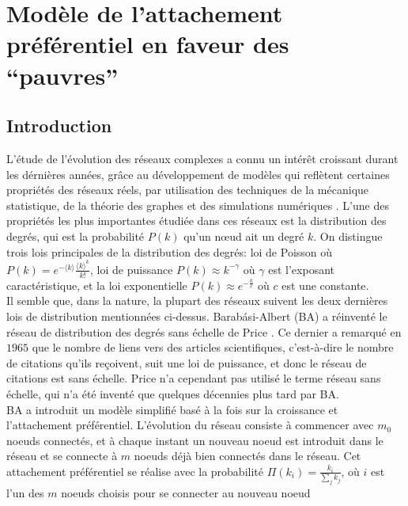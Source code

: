 
\newcommand{\kms}{\textless k_s(t) \textgreater}
\newcommand{\kmss}{\textless k_s^2(t) \textgreater}
\chapter{Modèle de l'attachement préférentiel en faveur des ``pauvres''}
\begin{minipage}{\textwidth}
	\linespread{1.2}
	\minitoc
\end{minipage}

\section{Introduction}
L'étude de l'évolution des réseaux complexes a connu un intérêt croissant durant les dérnières années, grâce au 
développement de modèles qui reflètent certaines propriétés des réseaux réels, par utilisation des techniques
de la  mécanique statistique, de la théorie des graphes et des simulations numériques 
\cite{BA1999,AB2002,Dorogovtsev-Mendes2002,Newman2003}. L'une des propriétés les plus importantes
étudiée dans ces réseaux est la distribution des degrés, qui est la probabilité $P(k)$ qu'un nœud ait un degré $k$.
On  distingue trois lois principales de la distribution des degrés: loi de Poisson où 
$P(k)=e^{-\langle k\rangle}\frac{\langle k\rangle^k}{k!}$, loi de puissance $P(k)\approx k^{-\gamma}$
où $\gamma$ est l'exposant caractéristique, et la loi exponentielle $P(k)\approx e^{-\frac{k}{c}}$ où
$c$ est une constante.\\
Il semble que, dans la nature, la plupart des réseaux suivent les deux dernières lois de distribution 
mentionnées ci-dessus. Barab\'{a}si-Albert (BA) a réinventé le réseau de distribution des degrés 
sans échelle de Price \cite{Price}. Ce dernier a  remarqué en $1965$ que le nombre de liens vers des articles 
scientifiques, c'est-à-dire le nombre de citations  qu'ils reçoivent, suit une loi de puissance, et donc le 
réseau de citations est sans échelle. Price n'a cependant pas utilisé le terme réseau sans échelle, qui n'a été 
inventé que quelques décennies plus tard par BA.\\
BA a introduit un modèle simplifié basé à la fois sur la croissance et 
l'attachement préférentiel. L'évolution du réseau consiste à commencer avec $m_0$ noeuds connectés, et à
chaque instant un nouveau noeud est introduit dans le réseau et se connecte à $m$ noeuds déjà bien connectés
dans le réseau. Cet attachement préférentiel se réalise avec la probabilité 
$\Pi(k_i)=\frac{k_i}{\sum_j k_j}$, où $i$ est l'un des $m$ noeuds choisis pour se connecter au nouveau noeud 
